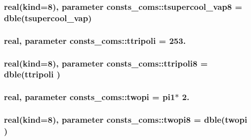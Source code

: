\subsubsection[{\texorpdfstring{tsupercool\+\_\+vap8}{tsupercool_vap8}}]{\setlength{\rightskip}{0pt plus 5cm}real(kind=8), parameter consts\+\_\+coms\+::tsupercool\+\_\+vap8 = dble({\bf tsupercool\+\_\+vap})}\hypertarget{namespaceconsts__coms_a60f7e49887cc212c75e63c51219699f1}{}\label{namespaceconsts__coms_a60f7e49887cc212c75e63c51219699f1}
\subsubsection[{\texorpdfstring{ttripoli}{ttripoli}}]{\setlength{\rightskip}{0pt plus 5cm}real, parameter consts\+\_\+coms\+::ttripoli = 253.}\hypertarget{namespaceconsts__coms_a7a8253ab1b6ed9a65304dcabc61587dd}{}\label{namespaceconsts__coms_a7a8253ab1b6ed9a65304dcabc61587dd}
\subsubsection[{\texorpdfstring{ttripoli8}{ttripoli8}}]{\setlength{\rightskip}{0pt plus 5cm}real(kind=8), parameter consts\+\_\+coms\+::ttripoli8 = dble({\bf ttripoli} )}\hypertarget{namespaceconsts__coms_aa9842c494b90586e7930b5d2a86da71a}{}\label{namespaceconsts__coms_aa9842c494b90586e7930b5d2a86da71a}
\subsubsection[{\texorpdfstring{twopi}{twopi}}]{\setlength{\rightskip}{0pt plus 5cm}real, parameter consts\+\_\+coms\+::twopi = {\bf pi1}$\ast$ 2.}\hypertarget{namespaceconsts__coms_a1e788efd80b24feef7cf49effb1c3106}{}\label{namespaceconsts__coms_a1e788efd80b24feef7cf49effb1c3106}
\subsubsection[{\texorpdfstring{twopi8}{twopi8}}]{\setlength{\rightskip}{0pt plus 5cm}real(kind=8), parameter consts\+\_\+coms\+::twopi8 = dble({\bf twopi} )}\hypertarget{namespaceconsts__coms_ab728c4b63f956137bc8a94c8ba42c675}{}\label{namespaceconsts__coms_ab728c4b63f956137bc8a94c8ba42c675}
